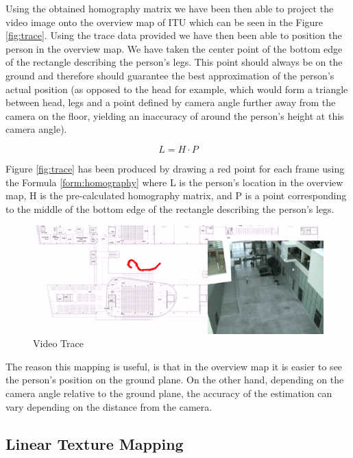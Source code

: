 Using the obtained homography matrix we have been then able to project the video image onto the overview map of ITU which can be seen in the Figure \ref{fig:trace}. Using the trace data provided we have then been able to position the person in the overview map. We have taken the center point of the bottom edge of the rectangle describing the person's legs. This point should always be on the ground and therefore should guarantee the best approximation of the person's actual position (as opposed to the head for example, which would form a triangle between head, legs and a point defined by camera angle further away from the camera on the floor, yielding an inaccuracy of around the person's height at this camera angle).

\begin{equation}
	L = H \cdot P
	\label{form:homography}
\end{equation}

Figure \ref{fig:trace} has been produced by drawing a red point for each frame using the Formula \ref{form:homography} where L is the person's location in the overview map, H is the pre-calculated homography matrix, and P is a point corresponding to the middle of the bottom edge of the rectangle describing the person's legs.

\begin{figure}[h!]
	\centering
	\includegraphics[width=\textwidth]{final/images/personlocationvideo.png}
	\caption{Video Trace}
	\label{fig:video_trace}
\end{figure}

The reason this mapping is useful, is that in the overview map it is easier to see the person's position on the ground plane. On the other hand, depending on the camera angle relative to the ground plane, the accuracy of the estimation can vary depending on the distance from the camera.

\subsection{Linear Texture Mapping}

